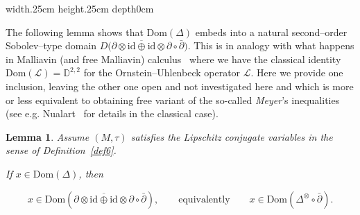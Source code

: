 \documentclass[10pt,a4paper,reqno]{amsart}
\newtheorem{lemma}[theorem]{Lemma}
\def\qed{ \hfill \vrule width.25cm height.25cm depth0cm\smallskip}
\newcommand{\Dom}{\mathrm{Dom}}
\begin{document}
\qed 
\begin{flushleft}
    The following lemma shows that $\Dom(\Delta)$ embeds into a natural second--order Sobolev--type
domain $D\big(\overline{\partial\otimes \mathrm{id}\oplus\mathrm{id}\otimes \partial}\circ \bar\partial\big)$. This is in analogy with what happens in Malliavin (and free Malliavin) calculus~\cite{BS,Di2} where we have
the classical identity $\Dom(\mathcal{L})=\mathbb D^{2,2}$ for the Ornstein--Uhlenbeck operator $\mathcal{L}$.
Here we provide one inclusion, leaving the other one open and not investigated here and which is more or less equivalent to obtaining free variant of the so-called \emph{Meyer}'s inequalities (see e.g.  Nualart~\cite[Section~1.5]{Nualart} for details in the classical case).

\end{flushleft}

\begin{lemma}\label{lma5}
Assume $(M,\tau)$ satisfies the Lipschitz conjugate variables in the sense of Definition~\ref{def6}.

If $x\in \Dom(\Delta)$, then


\[
x\in \Dom(\overline{\partial\otimes \mathrm{id}\oplus\mathrm{id}\otimes \partial}\circ \bar\partial),
\qquad\text{equivalently}\qquad x\in \Dom(\Delta^{\otimes}\circ \bar\partial).
\]


\end{lemma}
\end{document}
